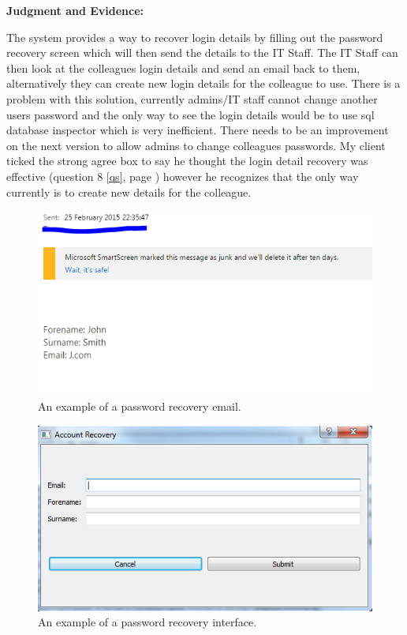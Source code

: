 \textbf{Judgment and Evidence:}

The system provides a way to recover login details by filling out the password recovery screen which will then send the details to the IT Staff. The IT Staff can then look at the colleagues login details and send an email back to them, alternatively they can create new login details for the colleague to use. There is a problem with this solution, currently admins/IT staff cannot change another users password and the only way to see the login details would be to use sql database inspector which is very inefficient. There needs to be an improvement on the next version to allow admins to change colleagues passwords. My client ticked the strong agree box to say he thought the login detail recovery was effective (question 8 \ref{qs}, page \pageref{qs}) however he recognizes that the only way currently is to create new details for the colleague.

\begin{figure}[H]
    \includegraphics[width=\textwidth]{./Testing/Images/ForgotPasswordValidationEmail.png}
    \caption{An example of a password recovery email.} 
\end{figure}

\begin{figure}[H]
    \includegraphics[width=\textwidth]{./Testing/Images/ForgotPassword.png}
    \caption{An example of a password recovery interface.} 
\end{figure}


